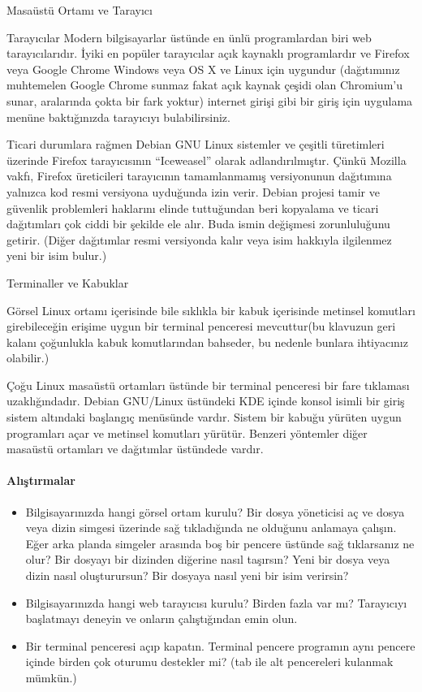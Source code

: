 \documentclass[10pt,a5paper]{book}
\begin{document}
\begin{section}{Masaüstü Ortamı ve Tarayıcı}
\begin{subsection}{Tarayıcılar}
Modern bilgisayarlar üstünde en ünlü programlardan biri web tarayıcılarıdır. İyiki en popüler tarayıcılar açık kaynaklı programlardır ve Firefox veya Google Chrome Windows veya OS X ve Linux için uygundur (dağıtımınız muhtemelen Google Chrome sunmaz fakat açık kaynak çeşidi olan Chromium’u sunar, aralarında çokta bir fark yoktur) internet girişi gibi bir giriş için uygulama menüne baktığınızda tarayıcıyı bulabilirsiniz.

Ticari durumlara rağmen Debian GNU Linux sistemler ve çeşitli türetimleri üzerinde Firefox tarayıcısının  “Iceweasel” olarak adlandırılmıştır. Çünkü Mozilla vakfı, Firefox üreticileri tarayıcının tamamlanmamış versiyonunun dağıtımına yalnızca kod resmi versiyona  uyduğunda izin verir. Debian projesi tamir ve güvenlik problemleri haklarını elinde tuttuğundan beri kopyalama ve ticari dağıtımları çok ciddi bir şekilde ele alır. Buda ismin değişmesi zorunluluğunu getirir. (Diğer dağıtımlar resmi versiyonda kalır veya isim hakkıyla ilgilenmez yeni bir isim bulur.) 
\end{subsection}
\begin{subsection}{Terminaller ve Kabuklar}

Görsel Linux ortamı içerisinde bile sıklıkla bir kabuk içerisinde metinsel komutları girebileceğin erişime uygun bir terminal penceresi mevcuttur(bu klavuzun geri kalanı çoğunlukla kabuk komutlarından bahseder, bu nedenle bunlara ihtiyacınız olabilir.)

Çoğu Linux masaüstü ortamları üstünde bir terminal penceresi bir fare tıklaması uzaklığındadır. Debian GNU/Linux üstündeki KDE içinde konsol isimli bir giriş sistem altındaki başlangıç menüsünde vardır. Sistem bir kabuğu yürüten uygun programları açar ve metinsel komutları yürütür. Benzeri yöntemler diğer masaüstü ortamları ve dağıtımlar üstündede vardır.
\end{subsection}

\paragraph{Alıştırmalar}{
\begin{itemize}
 \item Bilgisayarınızda hangi görsel ortam kurulu? Bir dosya yöneticisi aç ve dosya veya dizin simgesi üzerinde sağ tıkladığında ne olduğunu anlamaya çalışın. Eğer arka planda simgeler arasında boş bir pencere üstünde sağ tıklarsanız ne olur? Bir dosyayı bir dizinden diğerine nasıl taşırsın? Yeni bir dosya veya dizin nasıl oluşturursun? Bir dosyaya nasıl yeni bir isim verirsin?
 \item Bilgisayarınızda hangi web tarayıcısı kurulu? Birden fazla var mı? Tarayıcıyı başlatmayı deneyin ve onların çalıştığından emin olun.
 \item Bir terminal penceresi açıp kapatın. Terminal pencere programın aynı pencere içinde birden çok oturumu destekler mi? (tab ile alt pencereleri kulanmak mümkün.)
\end{itemize}}
\end{section}
\end{document}
